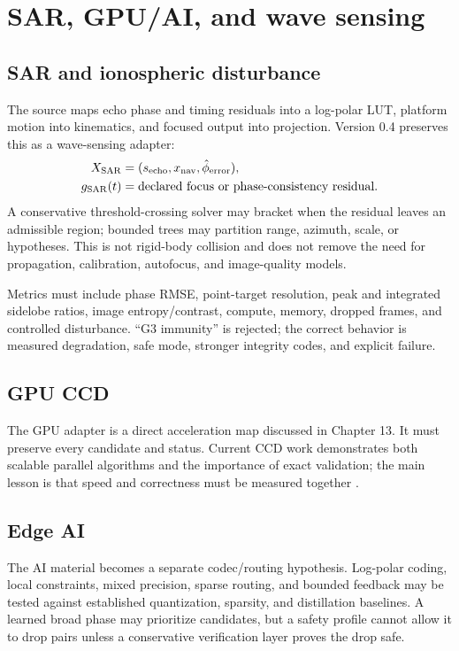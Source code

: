 \documentclass[11pt,a4paper,openany]{book}
\begin{document}
\chapter{SAR, GPU/AI, and wave sensing}
\section{SAR and ionospheric disturbance}
The source maps echo phase and timing residuals into a log-polar LUT, platform motion into kinematics, and focused output into projection. Version 0.4 preserves this as a wave-sensing adapter:
\begin{align}
X_{\rm SAR}&=(s_{\rm echo},x_{\rm nav},\hat\phi_{\rm error}),\\
g_{\rm SAR}(t)&=\text{declared focus or phase-consistency residual}.
\end{align}
A conservative threshold-crossing solver may bracket when the residual leaves an admissible region; bounded trees may partition range, azimuth, scale, or hypotheses. This is not rigid-body collision and does not remove the need for propagation, calibration, autofocus, and image-quality models.

Metrics must include phase RMSE, point-target resolution, peak and integrated sidelobe ratios, image entropy/contrast, compute, memory, dropped frames, and controlled disturbance. ``G3 immunity'' is rejected; the correct behavior is measured degradation, safe mode, stronger integrity codes, and explicit failure.

\section{GPU CCD}
The GPU adapter is a direct acceleration map discussed in Chapter 13. It must preserve every candidate and status. Current CCD work demonstrates both scalable parallel algorithms and the importance of exact validation; the main lesson is that speed and correctness must be measured together \citep{belgrod2023toi}.

\section{Edge AI}
The AI material becomes a separate codec/routing hypothesis. Log-polar coding, local constraints, mixed precision, sparse routing, and bounded feedback may be tested against established quantization, sparsity, and distillation baselines. A learned broad phase may prioritize candidates, but a safety profile cannot allow it to drop pairs unless a conservative verification layer proves the drop safe.
\end{document}
